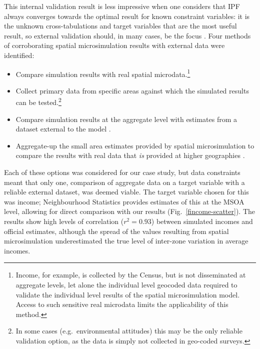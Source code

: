 This internal validation
result is less impressive when one considers that IPF always converges
towards the optimal result for known constraint variables:
it is the unknown cross-tabulations and
target variables that are the most useful result,
so external validation should, in many cases, be the focus
\citep{Morrissey2008, edwards2013validation}.
Four methods of corroborating spatial microsimulation results with external
data were identified:
\begin{itemize}
 \item Compare simulation results with real spatial microdata.\footnote{Income,
for example, is collected by the Census, but is not disseminated at aggregate
levels, let alone the individual level geocoded data required to validate the
individual level results of the spatial microsimulation model. Access to such
sensitive real microdata limits the applicability of this method.}
\item Collect primary data from specific areas against which the simulated
results can be tested.\footnote{In some cases (e.g.~environmental attitudes)
this may be the only reliable validation option, as the data is simply not
collected in geo-coded surveys.}
\item Compare simulation results at the aggregate level with estimates
from a dataset external to the model \citep{Morrissey2013}.
\item Aggregate-up the small area estimates provided by spatial microsimulation
to compare the results with real data that \emph{is} provided at higher
geographies \citep{Edwards2009}.
\end{itemize}
Each of these options was considered for our case study,
but data constraints meant that only one, comparison of aggregate data
on a target variable with a reliable external dataset, was deemed viable.
The target variable chosen for this was income; Neighbourhood Statistics
provides estimates of this at the MSOA level, allowing
for direct comparison with our results (Fig.~\ref{fincome-scatter}). The results show
high levels of correlation ($r^2 = 0.93$) between simulated incomes and official
estimates, although the spread of the values resulting from spatial microsimulation
underestimated the true level of inter-zone variation in average incomes.

